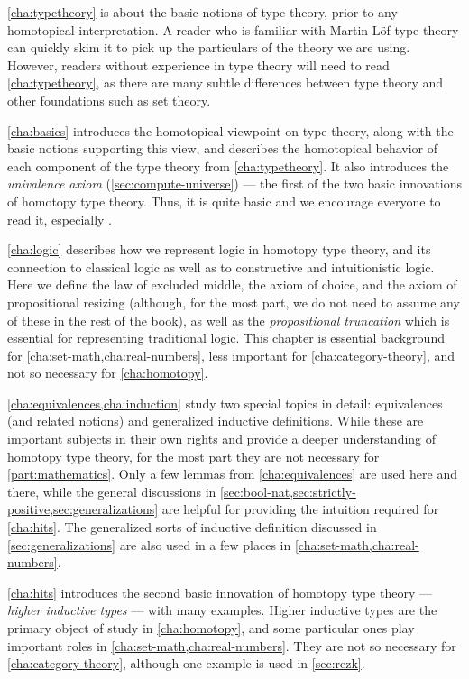 \cref{cha:typetheory} is about the basic notions of type theory, prior to any homotopical interpretation.
A reader who is familiar with Martin-L\"of type theory can quickly skim it to pick up the particulars of the theory we are using.
However, readers without experience in type theory will need to read \cref{cha:typetheory}, as there are many subtle differences between type theory and other foundations such as set theory.

\cref{cha:basics} introduces the homotopical viewpoint on type theory, along with the basic notions supporting this view, and describes the homotopical behavior of each component of the type theory from \cref{cha:typetheory}.
It also introduces the \emph{univalence axiom} (\cref{sec:compute-universe}) --- the first of the two basic innovations of homotopy type theory.
Thus, it is quite basic and we encourage everyone to read it, especially .

\cref{cha:logic} describes how we represent logic in homotopy type theory, and its connection to classical logic as well as to constructive and intuitionistic logic.
Here we define the law of excluded middle, the axiom of choice, and the axiom of propositional resizing (although, for the most part, we do not need to assume any of these in the rest of the book), as well as the \emph{propositional truncation} which is essential for representing traditional logic.
This chapter is essential background for \cref{cha:set-math,cha:real-numbers}, less important for \cref{cha:category-theory}, and not so necessary for \cref{cha:homotopy}.

\cref{cha:equivalences,cha:induction} study two special topics in detail: equivalences (and related notions) and generalized inductive definitions.
While these are important subjects in their own rights and provide a deeper understanding of homotopy type theory, for the most part they are not necessary for \cref{part:mathematics}.
Only a few lemmas from \cref{cha:equivalences} are used here and there, while the general discussions in \cref{sec:bool-nat,sec:strictly-positive,sec:generalizations} are helpful for providing the intuition required for \cref{cha:hits}.
The generalized sorts of inductive definition discussed in \cref{sec:generalizations} are also used in a few places in \cref{cha:set-math,cha:real-numbers}.

\cref{cha:hits} introduces the second basic innovation of homotopy type theory --- \emph{higher inductive types} --- with many examples.
Higher inductive types are the primary object of study in \cref{cha:homotopy}, and some particular ones play important roles in \cref{cha:set-math,cha:real-numbers}.
They are not so necessary for \cref{cha:category-theory}, although one example is used in \cref{sec:rezk}.

